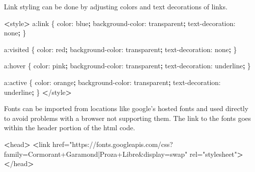 \documentclass[]{book}
\newenvironment{Shaded}{\begin{snugshade}}{\end{snugshade}}
\newcommand{\ExtensionTok}[1]{#1}
\newcommand{\FunctionTok}[1]{\textcolor[rgb]{0.00,0.00,0.00}{#1}}
\newcommand{\KeywordTok}[1]{\textcolor[rgb]{0.13,0.29,0.53}{\textbf{#1}}}
\newcommand{\NormalTok}[1]{#1}
\newcommand{\OperatorTok}[1]{\textcolor[rgb]{0.81,0.36,0.00}{\textbf{#1}}}
\newcommand{\StringTok}[1]{\textcolor[rgb]{0.31,0.60,0.02}{#1}}
\begin{document}
Link styling can be done by adjusting colors and text decorations of links.

\begin{Shaded}
\begin{Highlighting}[]
\OperatorTok{<}\ExtensionTok{style}\OperatorTok{>}                             
    \ExtensionTok{a}\NormalTok{:link \{                        }
      \ExtensionTok{color}\NormalTok{: blue}\KeywordTok{;}                  
      \ExtensionTok{background-color}\NormalTok{: transparent}\KeywordTok{;}
      \ExtensionTok{text-decoration}\NormalTok{: none}\KeywordTok{;}        
\NormalTok{    \}                               }
                                    
    \ExtensionTok{a}\NormalTok{:visited \{                     }
      \ExtensionTok{color}\NormalTok{: red}\KeywordTok{;}                   
      \ExtensionTok{background-color}\NormalTok{: transparent}\KeywordTok{;}
      \ExtensionTok{text-decoration}\NormalTok{: none}\KeywordTok{;}        
\NormalTok{    \}                               }
                                    
    \ExtensionTok{a}\NormalTok{:hover \{                       }
      \ExtensionTok{color}\NormalTok{: pink}\KeywordTok{;}                  
      \ExtensionTok{background-color}\NormalTok{: transparent}\KeywordTok{;}
      \ExtensionTok{text-decoration}\NormalTok{: underline}\KeywordTok{;}   
\NormalTok{    \}                               }
                                    
    \ExtensionTok{a}\NormalTok{:active \{                      }
      \ExtensionTok{color}\NormalTok{: orange}\KeywordTok{;}                
      \ExtensionTok{background-color}\NormalTok{: transparent}\KeywordTok{;}
      \ExtensionTok{text-decoration}\NormalTok{: underline}\KeywordTok{;}   
\NormalTok{    \}                               }
\OperatorTok{<}\NormalTok{/}\ExtensionTok{style}\OperatorTok{>}                            
\end{Highlighting}
\end{Shaded}

Fonts can be imported from locations like google's hosted fonts and used directly to avoid problems with a browser not supporting them.
The link to the fonts goes within the header portion of the html code.

\begin{Shaded}
\begin{Highlighting}[]
\OperatorTok{<}\FunctionTok{head}\OperatorTok{>}
    \OperatorTok{<}\FunctionTok{link}\NormalTok{ href=}\StringTok{"https://fonts.googleapis.com/css?family=Cormorant+Garamond|Proza+Libre&display=swap"}\NormalTok{ rel=}\StringTok{"stylesheet"}\OperatorTok{>}
\OperatorTok{<}\NormalTok{/}\ExtensionTok{head}\OperatorTok{>}
\end{Highlighting}
\end{Shaded}
\end{document}
